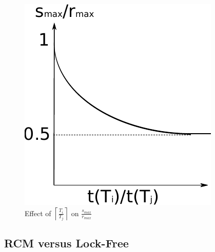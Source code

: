 \documentclass{sig-alternate}
\begin{document}
\begin{figure}
\begin{centering}
\includegraphics[scale=0.5]{figures/figure14}
\par\end{centering}
\caption{\label{fig14}Effect of $\left\lceil\frac{T_{i}}{T_{j}}\right\rceil$ on
$\frac{s_{max}}{r_{max}}$}
\end{figure}


\subsection{RCM versus Lock-Free}
\end{document}
